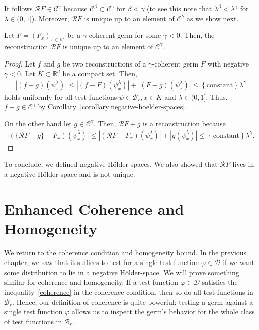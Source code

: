 It follows \( \mathcal{R}F \in \mathcal{C}^\gamma \) because \( \mathcal{C}^\beta \subset \mathcal{C}^\gamma \) for \( \beta < \gamma \) (to see this note that \( \lambda^\beta < \lambda^\gamma \) for \( \lambda \in (0,1] \)).  Moreover, \( \mathcal{R}F \) is unique up to an element of \( \mathcal{C}^\gamma \) as we show next.

\begin{corollary}
  Let \( F = (F_x)_{x \in \mathbb{R}^d} \) be a \( \gamma \)-coherent germ for some \( \gamma < 0 \). Then, the reconstruction \( \mathcal{R}F \) is unique up to an element of \( \mathcal{C}^\gamma \).
\end{corollary}

\begin{proof}
  Let \( f \) and \( g \) be two reconstructions of a  \( \gamma \)-coherent germ \( F \) with negative \( \gamma < 0 \). Let \( K \subset \mathbb{R}^d \) be a compact set. Then,
  \begin{align*}
    |(f - g)(\psi^\lambda_x)| \leq |(f - F)(\psi^\lambda_x)| + |(F - g)(\psi^\lambda_x)| \leq \left\{ \mathrm{constant} \right\} \lambda^\gamma
  \end{align*}
  holds uniformly for all test functions \( \psi \in \mathcal{B}_r, x \in K \) and \( \lambda \in (0,1] \). Thus, \( f - g \in \mathcal{C}^\gamma \) by Corollary~\ref{corollary:negative-hoelder-spaces}.

  On the other hand let \( g \in \mathcal{C}^\gamma \). Then, \( \mathcal{R}F + g \) is a reconstruction because 
  \begin{align*}
    |(\{\mathcal{R}F + g \} - F_x)(\psi^\lambda_x)| \leq |(\mathcal{R}F - F_x)(\psi^\lambda_x)| + |g(\psi^\lambda_x)| \leq \left\{ \mathrm{constant} \right\} \lambda^\gamma.
  \end{align*}
\end{proof}

To conclude, we defined negative Hölder spaces. We also showed that \( \mathcal{R}F \) lives in a negative Hölder space and is not unique.

\section{Enhanced Coherence and Homogeneity}

We return to the coherence condition and homogeneity bound. In the previous chapter, we saw that it suffices to test for a single test function \( \varphi \in \mathcal{D} \) if we want some distribution to lie in a negative Hölder-space. We will prove something similar for coherence and homogeneity. If a test function \( \varphi \in \mathcal{D} \) satisfies the inequality~\eqref{coherence} in the coherence condition, then so do all test functions in \( \mathcal{B}_r \). Hence, our definition of coherence is quite powerful; testing a germ against a single test function \( \varphi \) allows us to inspect the germ's behavior for the whole class of test functions in \( \mathcal{B}_r \).

